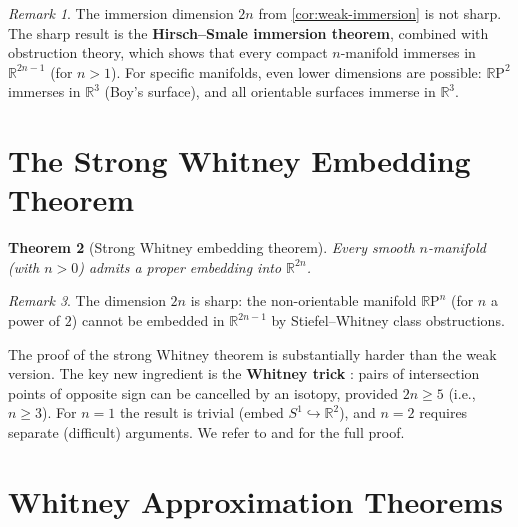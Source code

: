 \documentclass[12pt,a4paper,openany]{book}
\newtheorem{theorem}{Theorem}[section]
\theoremstyle{definition}
\theoremstyle{remark}
\newtheorem{remark}[theorem]{Remark}
\newcommand{\R}{\mathbb{R}}
\newcommand{\RP}{\mathbb{R}\mathrm{P}}
\begin{document}
\begin{remark}\label{rem:immersion-sharpness}
The immersion dimension $2n$ from \autoref{cor:weak-immersion} is not sharp.
The sharp result is the \textbf{Hirsch--Smale immersion theorem},
combined with obstruction theory, which shows that every compact
$n$-manifold immerses in $\R^{2n-1}$ (for $n>1$). For specific manifolds,
even lower dimensions are possible: $\RP^2$ immerses in $\R^3$
(Boy's surface), and all orientable surfaces immerse in $\R^3$.
\end{remark}

\section{The Strong Whitney Embedding Theorem}\label{sec:strong-whitney}

\begin{theorem}[Strong Whitney embedding theorem]\label{thm:strong-whitney}
Every smooth $n$-manifold (with $n > 0$) admits a proper embedding
into $\R^{2n}$.
\end{theorem}

\begin{remark}\label{rem:strong-whitney}
The dimension $2n$ is sharp: the non-orientable manifold
$\RP^n$ (for $n$ a power of $2$) cannot be embedded in $\R^{2n-1}$
by Stiefel--Whitney class obstructions.

The proof of the strong Whitney theorem is substantially harder than
the weak version. The key new ingredient is the \textbf{Whitney trick}
: pairs of intersection points of opposite sign can
be cancelled by an isotopy, provided $2n \ge 5$ (i.e., $n \ge 3$).
For $n = 1$ the result is trivial (embed $S^1 \hookrightarrow \R^2$),
and $n = 2$ requires separate (difficult) arguments. We refer to
\cite{whitney-embed} and \cite{adachi} for the full proof.
\end{remark}

\section{Whitney Approximation Theorems}\label{sec:whitney-approx}
\end{document}
